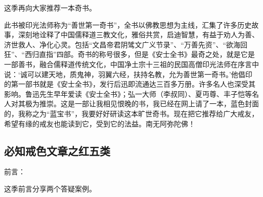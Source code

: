 这季再向大家推荐一本奇书。

\begin{book}[《安士全书》]
    此书被印光法师称为“善世第一奇书”，全书以佛教思想为主线，汇集了许多历史故事，深刻地诠释了中国儒释道三教文化，雅俗共赏，启迪智慧，有益于劝人为善、济世救人、净化心灵。包括“文昌帝君阴骘文广义节录”、“万善先资”、“欲海回狂”、“西归直指”四部。奇书的称号很多，但是《安士全书》最奇之处，就是它是一部善书，融合儒释道传统文化，中国净土宗十三祖的民国高僧印光法师在序言中说：‘诚可以建天地，质鬼神，羽翼六经，扶持名教，允为善世第一奇书。’他倡印的第一部书就是《安士全书》，发行后迅即流通达三百多万册。许多名人也深受其影响。鲁迅先生早年爱读《安士全书》；弘一大师（李叔同）、夏丏尊、丰子恺等名人对其极为推崇。这是一部让我相见恨晚的书，我已经在网上请了一本，蓝色封面的，我称之为“蓝宝书”，我要好好研读这本旷世奇书。现在把它推荐给广大戒友，希望有缘的戒友也能读到它，受到它的法益。南无阿弥陀佛！
\end{book}

\subsection{必知戒色文章之红五类}

前言：

这季前言分享两个答疑案例。

